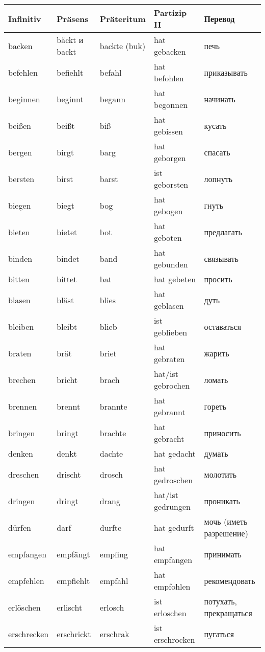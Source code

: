 
\begin{longtable}{|l|l|l|l|l|}
\hline
Infinitiv & Pr\"asens & Pr\"ateritum & Partizip II & Перевод \\
\hline\endhead
\hline\endfoot
backen & b\"ackt и backt & backte (buk) & hat gebacken & печь \\
befehlen & befiehlt & befahl & hat befohlen & приказывать \\
beginnen & beginnt & begann & hat begonnen & начинать \\
bei\ss en & bei\ss t & bi\ss  & hat gebissen & кусать \\
bergen & birgt & barg & hat geborgen & спасать \\
bersten & birst & barst & ist geborsten & лопнуть \\
biegen & biegt & bog & hat gebogen & гнуть \\
bieten & bietet & bot & hat geboten & предлагать \\
binden & bindet & band & hat gebunden & связывать \\
bitten & bittet & bat & hat gebeten & просить \\
blasen & bl\"ast & blies & hat geblasen & дуть \\
bleiben & bleibt & blieb & ist geblieben & оставаться  \\
braten & br\"at & briet & hat gebraten & жарить \\
brechen & bricht & brach & hat/ist gebrochen & ломать \\
brennen & brennt & brannte & hat gebrannt & гореть \\
bringen & bringt & brachte & hat gebracht & приносить  \\
denken & denkt & dachte & hat gedacht & думать \\
dreschen & drischt & drosch & hat gedroschen & молотить \\
dringen & dringt & drang & hat/ist gedrungen & проникать \\
d\"urfen & darf & durfte & hat gedurft & мочь (иметь разрешение) \\
empfangen & empf\"angt & empfing & hat empfangen & принимать \\
empfehlen & empfiehlt & empfahl & hat empfohlen & рекомендовать \\
erl\"oschen & erlischt & erlosch & ist erloschen & потухать, прекращаться \\
erschrecken & erschrickt & erschrak & ist erschrocken & пугаться \\

\end{longtable}
